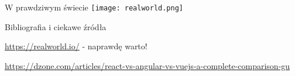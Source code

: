 \begin{frame}{W prawdziwym świecie}
	\centering
	\texttt{[image: realworld.png]}
\end{frame}

\begin{frame}{Bibliografia i ciekawe źródła}
  
	\begin{thebibliography}{9}
	
		\url{https://realworld.io/}
		- naprawdę warto!
		
		\url{https://dzone.com/articles/react-vs-angular-vs-vuejs-a-complete-comparison-gu}
	
	\end{thebibliography}

\end{frame}

